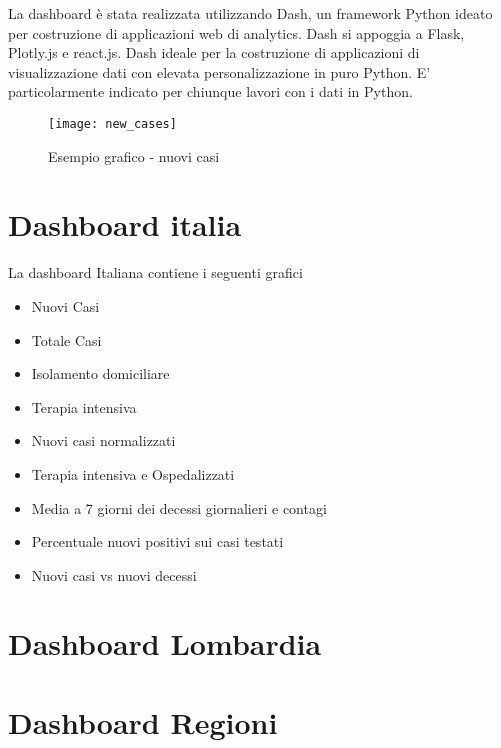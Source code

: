 
\noindent La dashboard è stata realizzata utilizzando Dash, un framework Python ideato per costruzione di applicazioni web di analytics.
Dash si appoggia a Flask, Plotly.js e react.js. Dash ideale per la costruzione di applicazioni di visualizzazione dati con elevata personalizzazione in puro Python. E’ particolarmente indicato per chiunque lavori con i dati in Python.

\begin{figure}[htp]
    \centering
    \texttt{[image: new\_cases]}
    \caption{Esempio grafico - nuovi casi}
    \label{fig:chart_example}
\end{figure}

\section{Dashboard italia}
La dashboard Italiana contiene i seguenti grafici
\begin{itemize}
    \item Nuovi Casi
    \item Totale Casi
    \item Isolamento domiciliare
    \item Terapia intensiva
    \item Nuovi casi normalizzati
    \item Terapia intensiva e Ospedalizzati
    \item Media a 7 giorni dei decessi giornalieri e contagi
    \item Percentuale nuovi positivi sui casi testati
    \item Nuovi casi vs nuovi decessi
\end{itemize}


\section{Dashboard Lombardia}

\section{Dashboard Regioni}

